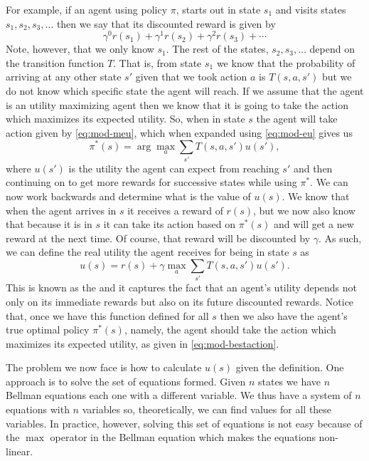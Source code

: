 For example, if an agent using policy $\pi$, starts out in state $s_1$
and visits states $s_1, s_2, s_3,\ldots$ then we say that its
discounted reward is given by
\begin{equation}
  \label{eq:mod-discounted}
  \gamma^0 r(s_1) + \gamma^1 r(s_2) + \gamma^2 r(s_3) + \cdots
\end{equation}
Note, however, that we only know $s_1$. The rest of the states, $s_2,
s_3,\ldots$ depend on the transition function $T$. That is, from state
$s_1$ we know that the probability of arriving at any other state $s'$
given that we took action $a$ is $T(s,a,s')$ but we do not know which
specific state the agent will reach. If we assume that the agent is an
utility maximizing agent then we know that it is going to take the
action which maximizes its expected utility. So, when in state $s$ the
agent will take action given by \eqref{eq:mod-meu}, which when
expanded using \eqref{eq:mod-eu} gives us 
\begin{equation}
  \label{eq:mod-bestaction}
  \pi^*(s) = \arg\max_a \sum_{s'} T(s,a,s') u(s'),
\end{equation}
  where $u(s')$ is the utility the agent
can expect from reaching $s'$ and then continuing on to get more
rewards for successive states while using $\pi^*$.  We can now work
backwards and determine what is the value of $u(s)$. We know that when
the agent arrives in $s$ it receives a reward of $r(s)$, but we now
also know that because it is in $s$ it can take its action based on
$\pi^*(s)$ and will get a new reward at the next time.  Of course,
that reward will be discounted by $\gamma$.  As such, we can define
the real utility the agent receives for being in state $s$ as
\begin{equation}
  \label{eq:bellman}
  u(s) = r(s) + \gamma \max_a \sum_{s'} T(s,a,s')u(s').
\end{equation}
This is known as the  and it captures the fact
that an agent's utility depends not only on its immediate rewards but
also on its future discounted rewards. Notice that, once we have this
function defined for all $s$ then we also have the agent's true
optimal policy $\pi^*(s)$, namely, the agent should take the action
which maximizes its expected utility, as given in
\eqref{eq:mod-bestaction}.

The problem we now face is how to calculate $u(s)$ given the
 definition.  One approach is to solve the set of equations
formed. Given $n$ states we have $n$ Bellman equations each one with a
different variable. We thus have a system of $n$ equations with $n$
variables so, theoretically, we can find values for all these
variables. In practice, however, solving this set of equations is not
easy because of the $\max$ operator in the Bellman equation which
makes the equations non-linear.

